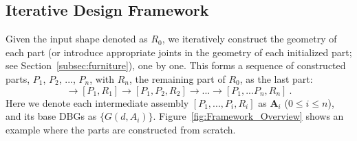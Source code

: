 
\subsection{Iterative Design Framework}
\label{subsec:framework}

Given the input shape denoted as $R_0$, we iteratively construct the geometry of each part (or introduce appropriate joints in the geometry of each initialized part; see Section~\ref{subsec:furniture}), one by one. This forms a sequence of constructed parts, $P_1$, $P_2$, $...$, $P_n$, with $R_n$, the remaining part of $R_0$, as the last part:
\begin{displaymath}
[R_0] \rightarrow [P_1,R_1] \rightarrow [P_1,P_2,R_2] \rightarrow ... \rightarrow [P_1,...P_n,R_n] \ .
\end{displaymath}
Here we denote each intermediate assembly $[P_1, ..., P_i, R_i]$ as $\mathbf{A}_{i}$ ($0 \leq i \leq n$), and its base DBGs as $\{ G(d, A_i) \}$. 
Figure~\ref{fig:Framework_Overview} shows an example where the parts are constructed from scratch.



